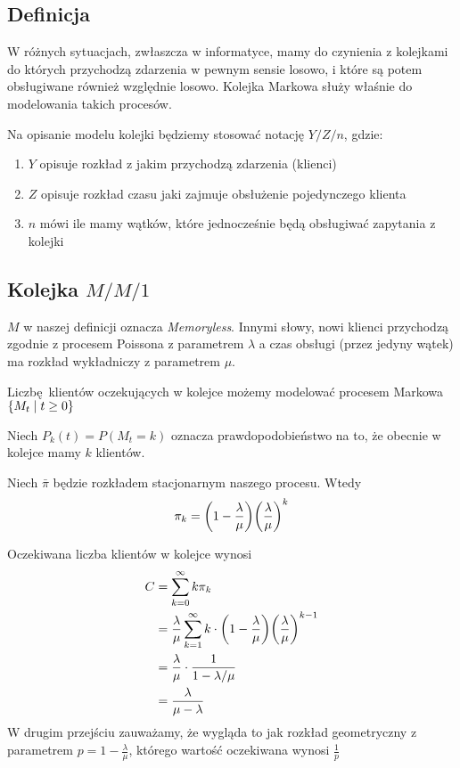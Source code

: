 \subsection{Definicja}

W różnych sytuacjach, zwłaszcza w informatyce, mamy do czynienia z kolejkami do których przychodzą zdarzenia w pewnym sensie losowo, i które są potem obsługiwane również względnie losowo.
Kolejka Markowa służy właśnie do modelowania takich procesów.

Na opisanie modelu kolejki będziemy stosować notację \( Y / Z / n \), gdzie:
\begin{enumerate}
	\item \( Y \) opisuje rozkład z jakim przychodzą zdarzenia (klienci)
	\item \( Z \) opisuje rozkład czasu jaki zajmuje obsłużenie pojedynczego klienta
	\item \( n \) mówi ile mamy wątków, które jednocześnie będą obsługiwać zapytania z kolejki
\end{enumerate}

\subsection{Kolejka \( M / M / 1 \) }
\( M \) w naszej definicji oznacza \textit{Memoryless}.
Innymi słowy, nowi klienci przychodzą zgodnie z procesem Poissona z parametrem \( \lambda \)
a czas obsługi (przez jedyny wątek) ma rozkład wykładniczy z parametrem \( \mu \).

Liczbę klientów oczekujących w kolejce możemy modelować procesem Markowa
\( \set{ M_t \mid t \geq 0 } \)

Niech \( P_k(t) = P(M_t = k) \) oznacza prawdopodobieństwo na to, że obecnie w kolejce mamy \( k \) klientów.

\begin{theorem}[strona 231 P\&C]
	Niech \( \bar \pi \) będzie rozkładem stacjonarnym naszego procesu. Wtedy
	\[ \pi_k = \pars{1 - \frac{\lambda}{\mu}}\pars{\frac{\lambda}{\mu}}^k \]
\end{theorem}

Oczekiwana liczba klientów w kolejce wynosi
\begin{align*}
	C
	 & = \sum_{k=0}^{\infty} k \pi_k                                                                                  \\
	 & = \frac{\lambda}{\mu} \sum_{k=1}^\infty k \cdot \pars{1 - \frac{\lambda}{\mu}}\pars{\frac{\lambda}{\mu}}^{k-1} \\
	 & = \frac{\lambda}{\mu} \cdot \frac{1}{1 - \lambda / \mu}                                                        \\
	 & = \frac{\lambda}{\mu - \lambda}
\end{align*}
W drugim przejściu zauważamy, że wygląda to jak rozkład geometryczny z parametrem \( p = 1 - \frac{\lambda}{\mu} \),
którego wartość oczekiwana wynosi \( \frac{1}{p} \)

